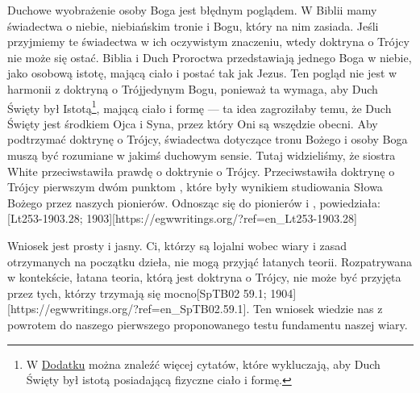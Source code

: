 Duchowe wyobrażenie osoby Boga jest błędnym poglądem. W Biblii mamy świadectwa o niebie, niebiańskim tronie i Bogu, który na nim zasiada. Jeśli przyjmiemy te świadectwa w ich oczywistym znaczeniu, wtedy doktryna o Trójcy nie może się ostać. Biblia i Duch Proroctwa przedstawiają jednego Boga w niebie, jako osobową istotę, mającą ciało i postać tak jak Jezus. Ten pogląd nie jest w harmonii z doktryną o Trójjedynym Bogu, ponieważ ta wymaga, aby Duch Święty był Istotą\footnote{W \hyperref[appendix:unauthenticated-reports]{Dodatku} można znaleźć więcej cytatów, które wykluczają, aby Duch Święty był istotą posiadającą fizyczne ciało i formę.}, mającą ciało i formę — ta idea zagroziłaby temu, że Duch Święty jest środkiem Ojca i Syna, przez który Oni są wszędzie obecni. Aby podtrzymać doktrynę o Trójcy, świadectwa dotyczące tronu Bożego i osoby Boga muszą być rozumiane w jakimś duchowym sensie. Tutaj widzieliśmy, że siostra White przeciwstawiła prawdę o  doktrynie o Trójcy. Przeciwstawiła doktrynę o Trójcy pierwszym dwóm punktom , które były wynikiem studiowania Słowa Bożego przez naszych pionierów. Odnosząc się do pionierów i , powiedziała: [Lt253-1903.28; 1903][https://egwwritings.org/?ref=en\_Lt253-1903.28]

Wniosek jest prosty i jasny. Ci, którzy są lojalni wobec wiary i zasad otrzymanych na początku dzieła, nie mogą przyjąć łatanych teorii. Rozpatrywana w kontekście, łatana teoria, którą jest doktryna o Trójcy, nie może być przyjęta przez tych, którzy trzymają się mocno[SpTB02 59.1; 1904][https://egwwritings.org/?ref=en\_SpTB02.59.1]. Ten wniosek wiedzie nas z powrotem do naszego pierwszego proponowanego testu fundamentu naszej wiary.



